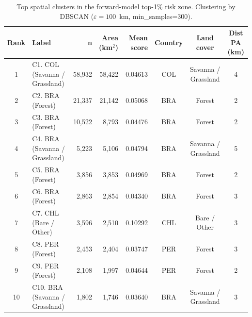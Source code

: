 \begin{table}[htbp]
  \centering
  \small
  \caption{Top spatial clusters in the forward-model top-1\% risk zone.
   Clustering by DBSCAN ($\varepsilon=100$~km, min\_samples=300).}
  \label{tab:spatial_clusters}
  \begin{tabular}{clrrrccc}
    \toprule
    Rank & Label & n & Area (km$^2$) & Mean score & Country & Land cover & Dist PA (km) \\
    \midrule
    1 & C1. COL (Savanna / Grassland) & 58,932 & 58,422 & 0.04613 & COL & Savanna / Grassland & 4 \\
    2 & C2. BRA (Forest) & 21,337 & 21,142 & 0.05068 & BRA & Forest & 2 \\
    3 & C3. BRA (Forest) & 10,522 & 8,793 & 0.04476 & BRA & Forest & 2 \\
    4 & C4. BRA (Savanna / Grassland) & 5,223 & 5,106 & 0.04794 & BRA & Savanna / Grassland & 5 \\
    5 & C5. BRA (Forest) & 3,856 & 3,853 & 0.04969 & BRA & Forest & 2 \\
    6 & C6. BRA (Forest) & 2,863 & 2,854 & 0.04340 & BRA & Forest & 3 \\
    7 & C7. CHL (Bare / Other) & 3,596 & 2,510 & 0.10292 & CHL & Bare / Other & 3 \\
    8 & C8. PER (Forest) & 2,453 & 2,404 & 0.03747 & PER & Forest & 3 \\
    9 & C9. PER (Forest) & 2,108 & 1,997 & 0.04644 & PER & Forest & 2 \\
    10 & C10. BRA (Savanna / Grassland) & 1,802 & 1,746 & 0.03640 & BRA & Savanna / Grassland & 3 \\
    \bottomrule
  \end{tabular}
\end{table}

